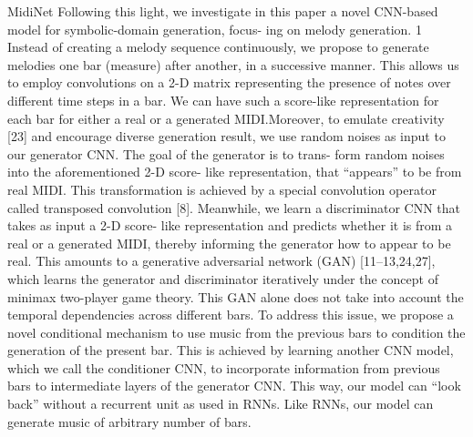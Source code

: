 \cite{Yang2017} MidiNet
Following this light, we investigate in this paper a novel CNN-based model for symbolic-domain generation, focus- ing on melody generation. 1 Instead of creating a melody sequence continuously, we propose to generate melodies one bar (measure) after another, in a successive manner. This allows us to employ convolutions on a 2-D matrix representing the presence of notes over different time steps in a bar. We can have such a score-like representation for each bar for either a real or a generated MIDI.Moreover, to emulate creativity [23] and encourage diverse generation result, we use random noises as input to our generator CNN. The goal of the generator is to trans- form random noises into the aforementioned 2-D score- like representation, that “appears” to be from real MIDI. This transformation is achieved by a special convolution operator called transposed convolution [8]. Meanwhile, we learn a discriminator CNN that takes as input a 2-D score- like representation and predicts whether it is from a real or a generated MIDI, thereby informing the generator how to appear to be real. This amounts to a generative adversarial network (GAN) [11–13,24,27], which learns the generator and discriminator iteratively under the concept of minimax two-player game theory. This GAN alone does not take into account the temporal dependencies across different bars. To address this issue, we propose a novel conditional mechanism to use music from the previous bars to condition the generation of the present bar. This is achieved by learning another CNN model, which we call the conditioner CNN, to incorporate information from previous bars to intermediate layers of the generator CNN. This way, our model can “look back” without a recurrent unit as used in RNNs. Like RNNs, our model can generate music of arbitrary number of bars.
